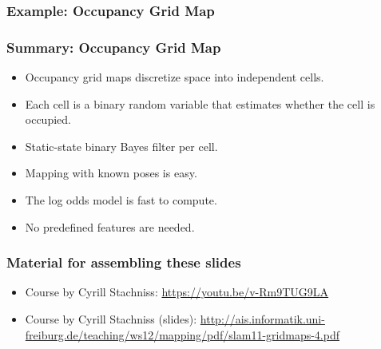 \begin{frame}
    \frametitle{Example: Occupancy Grid Map}
    

    \begin{center}
    \end{center}
        
\end{frame}
\begin{frame}
    \frametitle{Summary: Occupancy Grid Map}
    \begin{itemize}
    \item Occupancy grid maps discretize space into independent cells.
    \item Each cell is a binary random variable that estimates whether the cell is occupied.
    \item Static-state binary Bayes filter per cell.
    \item Mapping with known poses is easy.
    \item The log odds model is fast to compute.
    \item No predefined features are needed.
    \end{itemize}
    
    \end{frame}
    
    \begin{frame}
    \frametitle{Material for assembling these slides}
    
    \begin{itemize}
    \item Course by Cyrill Stachniss: \url{https://youtu.be/v-Rm9TUG9LA}
    
    \item Course by Cyrill Stachniss (slides): \url{http://ais.informatik.uni-freiburg.de/teaching/ws12/mapping/pdf/slam11-gridmaps-4.pdf}
     \end{itemize}
\end{frame}